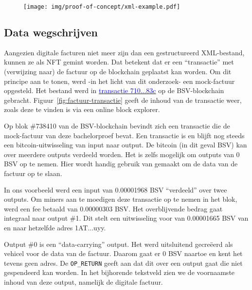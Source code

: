 \begin{figure}[H]
	\centering
	\texttt{[image: img/proof-of-concept/xml-example.pdf]}
\end{figure}


\subsection{Data wegschrijven}
\label{sub:minting}

Aangezien digitale facturen niet meer zijn dan een gestructureerd XML-bestand, kunnen ze als NFT gemint worden. Dat betekent dat er een ``transactie'' met (verwijzing naar) de factuur op de blockchain geplaatst kan worden. Om dit principe aan te tonen, werd -in het licht van dit onderzoek- een mock-factuur opgesteld. Het bestand werd in \href{https://whatsonchain.com/tx/71054b6b9aef47124cc5db9983a06d7608ec408c1ed3ee3a0ad0e34e2951c83c}{\textcolor{blue}{transactie 710...83c}} op de BSV-blockchain gebracht. Figuur~\ref{fig:factuur-transactie} geeft de inhoud van de transactie weer, zoals deze te vinden is via een online block explorer.

Op blok \#738410 van de BSV-blockchain bevindt zich een transactie die de mock-factuur van deze bachelorproef bevat. Een transactie is en blijft nog steeds een bitcoin-uitwisseling van input naar output. De bitcoin (in dit geval BSV) kan over meerdere outputs verdeeld worden. Het is zelfs mogelijk om outputs van 0 BSV op te nemen. Hier wordt handig gebruik van gemaakt om de data van de factuur op te slaan.

In ons voorbeeld werd een input van 0.00001968 BSV ``verdeeld'' over twee outputs. Om miners aan te moedigen deze transactie op te nemen in het blok, werd een fee betaald van 0.00000303 BSV. Het overblijvende bedrag gaat integraal naar output \#1. Dit stelt een uitwisseling voor van 0.00001665 BSV van en naar hetzelfde adres 1AT...uyy.

Output \#0 is een ``data-carrying'' output. Het werd uitsluitend gecreëerd als vehicel voor de data van de factuur. Daarom gaat er 0 BSV naartoe en kent het tevens geen adres. De \verb|OP_RETURN| geeft aan dat dit over een output gaat die niet gespendeerd kan worden. In het bijhorende tekstveld zien we de voornaamste inhoud van deze output, namelijk de digitale factuur.

